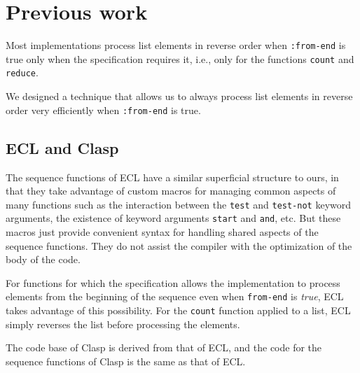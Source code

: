 \section{Previous work}

Most implementations process list elements in reverse order when
\texttt{:from-end} is true only when the specification requires it,
i.e., only for the functions \texttt{count} and \texttt{reduce}.

We designed a technique \cite{Durand:2015:ELS:reverse} that allows us
to always process list elements in reverse order very efficiently when
\texttt{:from-end} is true.

\subsection{ECL and Clasp}

The sequence functions of ECL have a similar superficial structure to
ours, in that they take advantage of custom macros for managing common
aspects of many functions such as the interaction between the
\texttt{test} and \texttt{test-not} keyword arguments, the existence
of keyword arguments \texttt{start} and \texttt{and}, etc.
But these macros just provide convenient syntax for handling shared
aspects of the sequence functions.  They do not assist the compiler
with the optimization of the body of the code.

For functions for which the \commonlisp{} specification allows the
implementation to process elements from the beginning of the sequence
even when \texttt{from-end} is \emph{true}, ECL takes advantage of
this possibility.  For the \texttt{count} function applied to a list,
ECL simply reverses the list before processing the elements.

The \commonlisp{} code base of Clasp is derived from that of ECL, and
the code for the sequence functions of Clasp is the same as that of
ECL.
